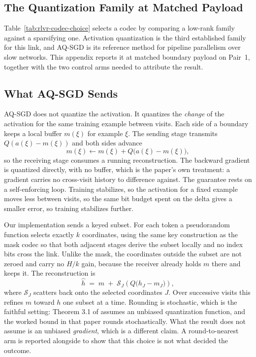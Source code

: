 \begin{revised}
\section{The Quantization Family at Matched Payload}
\label{app:rlvr-aqsgd}

Table~\ref{tab:rlvr-codec-choice} selects a codec by comparing a low-rank
family against a sparsifying one. Activation quantization is the third
established family for this link, and AQ-SGD \citep{wang2022aqsgd} is its
reference method for pipeline parallelism over slow networks. This appendix
reports it at matched boundary payload on Pair~1, together with the two control
arms needed to attribute the result.

\subsection{What AQ-SGD Sends}

AQ-SGD does not quantize the activation. It quantizes the \emph{change} of the
activation for the same training example between visits. Each side of a
boundary keeps a local buffer $m(\xi)$ for example $\xi$. The sending stage
transmits $Q(a(\xi)-m(\xi))$ and both sides advance
\begin{equation}
m(\xi)\leftarrow m(\xi)+Q\big(a(\xi)-m(\xi)\big),
\label{eq:aqsgd-update}
\end{equation}
so the receiving stage consumes a running reconstruction. The backward gradient
is quantized directly, with no buffer, which is the paper's own treatment: a
gradient carries no cross-visit history to difference against. The guarantee
rests on a self-enforcing loop. Training stabilizes, so the activation for a
fixed example moves less between visits, so the same bit budget spent on the
delta gives a smaller error, so training stabilizes further.

Our implementation sends a keyed subset. For each token a pseudorandom function
selects exactly $k$ coordinates, using the same key construction as the mask
codec so that both adjacent stages derive the subset locally and no index bits
cross the link. Unlike the mask, the coordinates outside the subset are not
zeroed and carry no $H/k$ gain, because the receiver already holds $m$ there and
keeps it. The reconstruction is
\begin{equation}
\hat h \;=\; m \;+\; \mathcal S_J\!\left(Q\big(h_J-m_J\big)\right),
\label{eq:aqsgd-subset}
\end{equation}
where $\mathcal S_J$ scatters back onto the selected coordinates $J$. Over
successive visits this refines $m$ toward $h$ one subset at a time. Rounding is
stochastic, which is the faithful setting: Theorem 3.1 of
\citet{wang2022aqsgd} assumes an unbiased quantization function, and the
worked bound in that paper rounds stochastically. What the result does not
assume is an unbiased \emph{gradient}, which is a different claim. A
round-to-nearest arm is reported alongside to show that this choice is not what
decided the outcome.


\end{revised}
